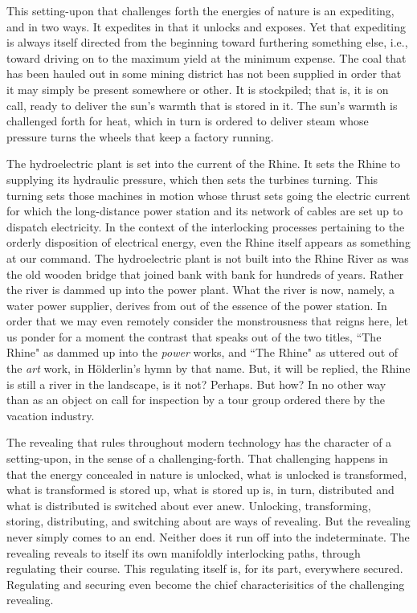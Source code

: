 This setting-upon that challenges forth the energies of nature is an expediting, and in two ways. It expedites in that it unlocks and exposes. Yet that expediting is always itself directed from the beginning toward furthering something else, i.e., toward driving on to the maximum yield at the minimum expense. The coal that has been hauled out in some mining district has not been supplied in order that it may simply be present somewhere or other. It is stockpiled; that is, it is on call, ready to deliver the sun's warmth that is stored in it. The sun's warmth is challenged forth for heat, which in turn is ordered to deliver steam whose pressure turns the wheels that keep a factory running.

The hydroelectric plant is set into the current of the Rhine. It sets the Rhine to supplying its hydraulic pressure, which then sets the turbines turning. This turning sets those machines in motion whose thrust sets going the electric current for which the long-distance power station and its network of cables are set up to dispatch electricity. In the context of the interlocking processes pertaining to the orderly disposition of electrical energy, even the Rhine itself appears as something at our command. The hydroelectric plant is not built into the Rhine River as was the old wooden bridge that joined bank with bank for hundreds of years. Rather the river is dammed up into the power plant. What the river is now, namely, a water power supplier, derives from out of the essence of the power station. In order that we may even remotely consider the monstrousness that reigns here, let us ponder for a moment the contrast that speaks out of the two titles, ``The Rhine" as dammed up into the \textit{power} works, and ``The Rhine" as uttered out of the \textit{art} work, in H\"{o}lderlin's hymn by that name. But, it will be replied, the Rhine is still a river in the landscape, is it not? Perhaps. But how? In no other way than as an object on call for inspection by a tour group ordered there by the vacation industry.

The revealing that rules throughout modern technology has the character of a setting-upon, in the sense of a challenging-forth. That challenging happens in that the energy concealed in nature is unlocked, what is unlocked is transformed, what is transformed is stored up, what is stored up is, in turn, distributed and what is distributed is switched about ever anew. Unlocking, transforming, storing, distributing, and switching about are ways of revealing. But the revealing never simply comes to an end. Neither does it run off into the indeterminate. The revealing reveals to itself its own manifoldly interlocking paths, through regulating their course. This regulating itself is, for its part, everywhere secured. Regulating and securing even become the chief characterisitics of the challenging revealing.

